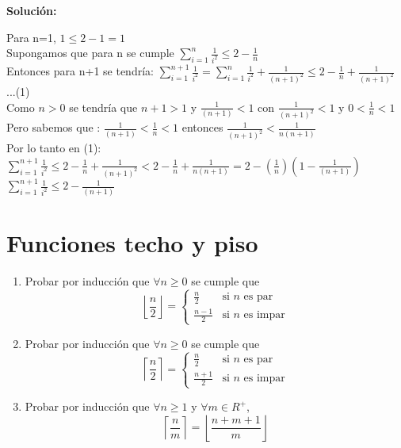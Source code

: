 \documentclass{article}
\begin{document}
\begin{enumerate}
  \textbf{Solución:}
  
  Para n=1, \( 1 \leq 2 - 1 = 1\) \\
  Supongamos que para n se cumple \(\sum_{i=1}^n\frac{1}{i^2}\leq 2-\frac{1}{n}\)\\
  Entonces para n+1 se tendría:
  \(\sum_{i=1}^{n+1}\frac{1}{i^2} = \sum_{i=1}^{n}\frac{1}{i^2} + \frac{1}{(n+1)^2} \leq 2-\frac{1}{n} + \frac{1}{(n+1)^2}\) ...(1)\\
  Como $n > 0$ se tendría que $ n+1 > 1$ y $ \frac{1}{(n+1)} < 1$ con $ \frac{1}{(n+1)^2} < 1$ y $ 0<\frac{1}{n} < 1$\\
  Pero sabemos que : $ \frac{1}{(n+1)} < \frac{1}{n} < 1$ entonces $ \frac{1}{(n+1)^2} < \frac{1}{n(n+1)}$\\
  Por lo tanto en (1):\\
   \(\sum_{i=1}^{n+1}\frac{1}{i^2}   \leq 2-\frac{1}{n} + \frac{1}{(n+1)^2} < 2-\frac{1}{n} + \frac{1}{n(n+1)} = 2 - (\frac{1}{n})(1 - \frac{1}{(n+1)} )\)\\
   \(\sum_{i=1}^{n+1}\frac{1}{i^2} \leq 2 - \frac{1}{(n+1)}\)\\
   
  
\end{enumerate}

\section{Funciones techo y piso}
\begin{enumerate}
  \item Probar por inducción que $\forall n \geq 0$ se cumple que
  \[
      \left \lfloor\frac{n}{2} \right \rfloor=
      \left\{
          \begin{array}{ll}
              \frac{n}{2}& \textrm{si $n$ es par}\\
              \frac{n-1}{2}& \textrm{si $n$ es impar}
          \end{array}
      \right.
  \]
  
  \item Probar por inducción que $\forall n \geq 0$ se cumple que
  \[
    \left \lceil\frac{n}{2} \right \rceil=
    \left\{
    \begin{array}{ll}
    \frac{n}{2}& \textrm{si $n$ es par}\\
    \frac{n+1}{2}& \textrm{si $n$ es impar}
    \end{array}
    \right.
  \]
  
  \item Probar por inducción que $\forall n \geq 1$ y $\forall m\in R^{+}$,
  \[
    \left\lceil\frac{n}{m}\right\rceil=\left\lfloor\frac{n+m+1}{m}\right\rfloor
  \]

\end{enumerate}
\end{document}
